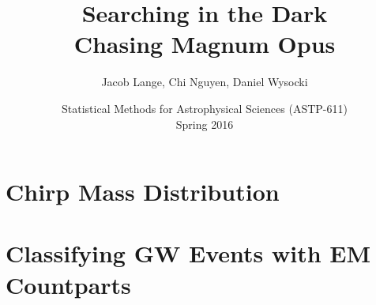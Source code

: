 \documentclass[DIV=calc, paper=a4, 11pt, twocolumn]{scrartcl}
\title{
Searching in the Dark
\\
Chasing Magnum Opus
}
\author{
  Jacob Lange, Chi Nguyen, Daniel Wysocki
}
\date{
  Statistical Methods for Astrophysical Sciences (ASTP-611)
  \\
  Spring 2016
}
\begin{document}
\maketitle

\thispagestyle{fancy} %




\section{Chirp Mass Distribution}
\label{sec:dist}





\section{Classifying GW Events with EM Countparts}
\label{sec:classifier}




\printbibliography
\end{document}

